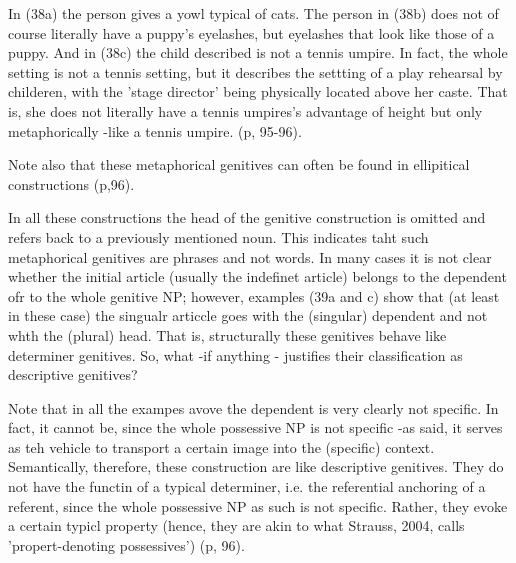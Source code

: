 \documentclass[11pt,a4paper]{article}
\begin{document}
	
	In (38a) the person gives a yowl typical of cats. The person in (38b) does not of course literally have a puppy's 
	eyelashes, but eyelashes that look like those of a puppy. And in (38c) the child described is not a tennis umpire. 
	In fact, the whole setting is not a tennis setting, but it describes the settting of a play rehearsal by childeren,
	with the 'stage director' being physically located above her caste. That is, she does not literally have a tennis umpires's 
	advantage of height but only metaphorically -like a tennis umpire. (p, 95-96). 
	
	Note also that these metaphorical genitives can often be found in ellipitical constructions (p,96).
	
	In all these constructions the head of the genitive construction is omitted and refers back to a previously mentioned
	noun. This indicates taht such metaphorical genitives are phrases and not words. In many cases it is not clear whether the 
	initial article (usually the indefinet article) belongs to the dependent ofr to the whole genitive NP; however, examples (39a and c)
	show that (at least in these case) the singualr articcle goes with the (singular) dependent and not whth the (plural) head. 
	That is, structurally these genitives behave like determiner genitives. So, what -if anything - justifies their 
	classification as descriptive genitives?
	
	Note that in all the exampes avove the dependent is very clearly not specific. In fact, it cannot be, since the whole 
	possessive NP is not specific -as said, it serves as teh vehicle to transport a certain image into the (specific) context.
	Semantically, therefore, these construction are like descriptive genitives. They do not have the functin of a typical determiner, i.e. the referential
	anchoring of a referent, since the whole possessive NP as such is not specific. Rather, they evoke a certain typicl property 
	(hence, they are akin to what Strauss, 2004, calls 'propert-denoting possessives') (p, 96). 
	
\end{document}
